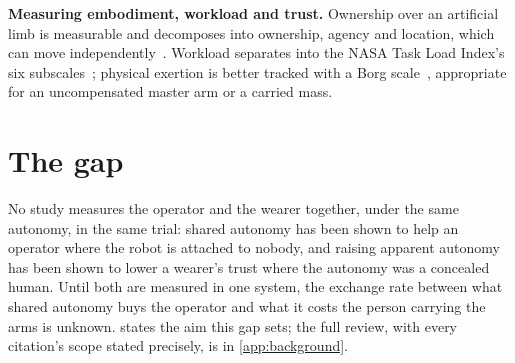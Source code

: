 \textbf{Measuring embodiment, workload and trust.} Ownership over an
artificial limb is measurable and decomposes into ownership, agency and
location, which can move independently~\cite{botvinick1998rubber,longo2008embodiment}.
Workload separates into the NASA Task Load Index's six
subscales~\cite{hart1988nasatlx}; physical exertion is better tracked with a
Borg scale~\cite{borg1982perceived}, appropriate for an uncompensated master
arm or a carried mass.

\section{The gap}

No study measures the operator and the wearer together, under the same
autonomy, in the same trial: shared autonomy has been shown to help an
operator where the robot is attached to nobody, and raising apparent
autonomy has been shown to lower a wearer's trust where the autonomy was a
concealed human. Until both are measured in one system, the exchange rate
between what shared autonomy buys the operator and what it costs the person
carrying the arms is unknown.  states the aim this gap sets;
the full review, with every citation's scope stated precisely, is in
\cref{app:background}.
